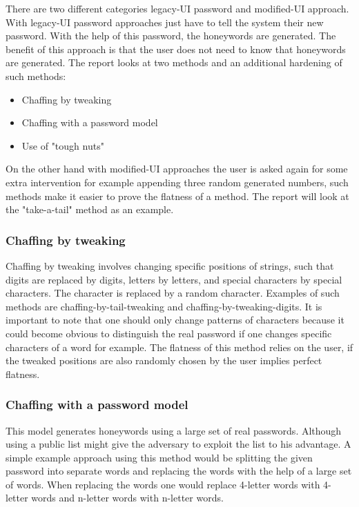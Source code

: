 \documentclass[../main.tex]{subfiles}
\begin{document}
There are two different categories legacy-UI password and modified-UI approach.
With legacy-UI password approaches just have to tell the system their new
password. With the help of this password, the honeywords are generated. The benefit
of this approach is that the user does not need to know that honeywords are
generated. The report looks at two methods and an additional hardening of such
methods:

\begin{itemize}
  \item Chaffing by tweaking
  \item Chaffing with a password model
  \item Use of "tough nuts"
\end{itemize}

On the other hand with modified-UI approaches the user is asked
again for some extra intervention for example appending three random generated
numbers, such methods make it easier to prove the flatness of a method. The report will
look at the "take-a-tail" method as an example.

\subsubsection{Chaffing by tweaking}

Chaffing by tweaking involves changing specific positions of
strings, such that digits are replaced by digits, letters by letters, and
special characters by special characters. The character is replaced by a random
character. Examples of such methods are chaffing-by-tail-tweaking and
chaffing-by-tweaking-digits. It is important to note that one should only
change patterns of characters because it could become obvious to distinguish
the real password if one changes specific characters of a word for example. The flatness
of this method relies on the user, if the tweaked positions are also randomly chosen by
the user implies perfect flatness.

\subsubsection{Chaffing with a password model}

This model generates honeywords using a large set of real passwords. Although
using a public list might give the adversary to exploit the list to his
advantage. A simple example approach using this method would be splitting
the given password into separate words and replacing the words with the help of a
large set of words. When replacing the words one would replace 4-letter words
with 4-letter words and n-letter words with n-letter words.
\end{document}
